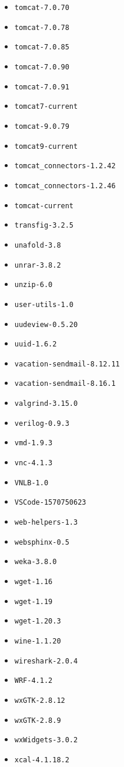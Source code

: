\begin{itemize}
\item \verb|tomcat-7.0.70|
\item \verb|tomcat-7.0.78|
\item \verb|tomcat-7.0.85|
\item \verb|tomcat-7.0.90|
\item \verb|tomcat-7.0.91|
\item \verb|tomcat7-current|
\item \verb|tomcat-9.0.79|
\item \verb|tomcat9-current|
\item \verb|tomcat_connectors-1.2.42|
\item \verb|tomcat_connectors-1.2.46|
\item \verb|tomcat-current|
\item \verb|transfig-3.2.5|
\item \verb|unafold-3.8|
\item \verb|unrar-3.8.2|
\item \verb|unzip-6.0|
\item \verb|user-utils-1.0|
\item \verb|uudeview-0.5.20|
\item \verb|uuid-1.6.2|
\item \verb|vacation-sendmail-8.12.11|
\item \verb|vacation-sendmail-8.16.1|
\item \verb|valgrind-3.15.0|
\item \verb|verilog-0.9.3|
\item \verb|vmd-1.9.3|
\item \verb|vnc-4.1.3|
\item \verb|VNLB-1.0|
\item \verb|VSCode-1570750623|
\item \verb|web-helpers-1.3|
\item \verb|websphinx-0.5|
\item \verb|weka-3.8.0|
\item \verb|wget-1.16|
\item \verb|wget-1.19|
\item \verb|wget-1.20.3|
\item \verb|wine-1.1.20|
\item \verb|wireshark-2.0.4|
\item \verb|WRF-4.1.2|
\item \verb|wxGTK-2.8.12|
\item \verb|wxGTK-2.8.9|
\item \verb|wxWidgets-3.0.2|
\item \verb|xcal-4.1.18.2|

\end{itemize}
